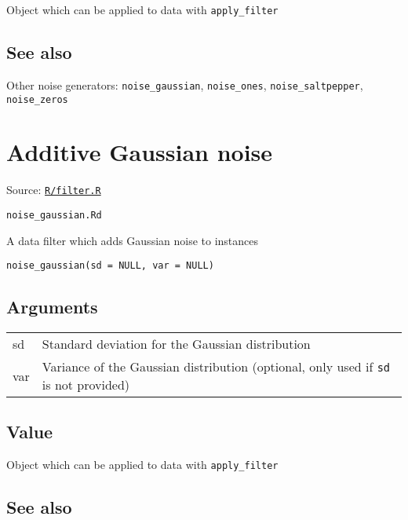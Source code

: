 Object which can be applied to data with \texttt{apply\_filter}

\hypertarget{see-also}{\subsection{\texorpdfstring{\protect\hyperlink{see-also}{}See
also}{See also}}\label{see-also}}

Other noise generators: \texttt{noise\_gaussian}, \texttt{noise\_ones},
\texttt{noise\_saltpepper}, \texttt{noise\_zeros}

\section{Additive Gaussian noise}\label{additive-gaussian-noise}

Source:
\href{https://github.com/fdavidcl/ruta/blob/master/R/filter.R}{\texttt{R/filter.R}}

\texttt{noise\_gaussian.Rd}

A data filter which adds Gaussian noise to instances

\begin{verbatim}
noise_gaussian(sd = NULL, var = NULL)
\end{verbatim}

\hypertarget{arguments}{\subsection{\texorpdfstring{\protect\hyperlink{arguments}{}Arguments}{Arguments}}\label{arguments}}

\begin{longtable}[c]{@{}>{\small}p{3cm}>{\raggedright}p{12.5cm}@{}}
\toprule
sd & Standard deviation for the Gaussian distribution\tabularnewline
var & Variance of the Gaussian distribution (optional, only used if
\texttt{sd} is not provided)\tabularnewline
\bottomrule
\end{longtable}

\hypertarget{value}{\subsection{\texorpdfstring{\protect\hyperlink{value}{}Value}{Value}}\label{value}}

Object which can be applied to data with \texttt{apply\_filter}

\hypertarget{see-also}{\subsection{\texorpdfstring{\protect\hyperlink{see-also}{}See
also}{See also}}\label{see-also}}


